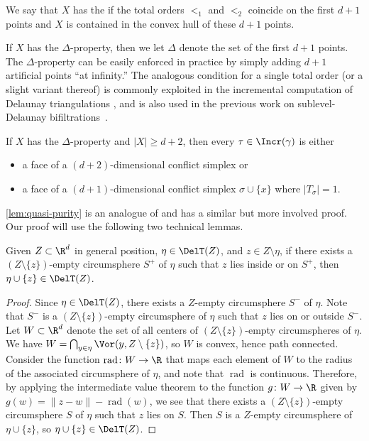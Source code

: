 %
\begin{definition}
We say that $X$ has the  if the total orders $<_1$
and $<_2$ coincide on the first $d+1$ points and $X$ is contained in
the convex hull of these $d+1$ points. 
\end{definition}
%
If $X$ has the $\Delta$-property, then we let $\Delta$ denote the set of the first $d+1$ points.  
%
The $\Delta$-property can be easily enforced in practice by simply adding $d+1$ artificial points ``at
infinity.''  The analogous condition for a single total order (or a
slight variant thereof) is commonly exploited in the incremental computation of
Delaunay triangulations \cite{edelsbrunnerIncrementalTopologicalFlipping1996,
  boissonnat2009incremental,boissonnat2000triangulations}, and is also used in
the previous work on sublevel-Delaunay
bifiltrations~\cite{alonsoDelaunayBifiltrationsFunctions2024}. 
%
\begin{proposition}
\label{lem:quasi-purity} If $X$ has the $\Delta$-property and
  $|X| \geq d+2$, then every $\tau \in \Incr( \gamma)$ is either
  \begin{itemize}[noitemsep,topsep=0pt]
    \item a face of a $(d+2)$-dimensional conflict simplex or
    \item a face of a $(d+1)$-dimensional conflict simplex $\sigma \cup \{x\}$ where $|T_{\sigma}|=1$.
  \end{itemize}
\end{proposition}
%
\cref{lem:quasi-purity} is an analogue of \cite[Lemma 2.3]{alonsoDelaunayBifiltrationsFunctions2024} and has a similar but more involved proof. Our proof  will use the following two technical lemmas.
%
\begin{lemma}\label{Lem:Conflict_Technicality_1}
Given $Z\subset \R^d$ in general position, $\eta\in \DelT(Z)$, and $z\in Z\setminus \eta$, if there exists a $(Z\setminus \{z\})$-empty circumsphere $S^+$ of $\eta$ such that $z$ lies inside or on $S^+$, then $\eta\cup\{z\}\in \DelT(Z)$.  
%
\end{lemma}
%
\begin{proof}
Since $\eta\in \DelT(Z)$, there exists a $Z$-empty circumsphere $S^-$ of $\eta$.  Note that $S^-$ is a $(Z\setminus \{z\})$-empty circumsphere of $\eta$ such that $z$ lies on or outside $S^-$.  Let $W\subset \R^d$ denote the set of all centers of $(Z\setminus \{z\})$-empty circumspheres of $\eta$.  We have $W=\bigcap_{y\in \eta} \Vor(y, Z\setminus \{z\})$, so $W$ is convex, hence path connected.  Consider the function $\operatorname{rad}\colon W\to \R$ that maps each element of $W$ to the radius of the associated circumsphere of $\eta$, and note that $\operatorname{rad}$ is continuous.  Therefore, by applying the intermediate value theorem to the function $g\colon W\to \R$ given by $g(w)=\|z-w\|-\operatorname{rad}(w)$, we see that there exists a $(Z\setminus \{z\})$-empty circumsphere $S$ of $\eta$ such that $z$ lies on $S$.  Then $S$ is a $Z$-empty circumsphere of $\eta\cup\{z\}$, so $\eta\cup\{z\}\in \DelT(Z)$.  
\end{proof}
